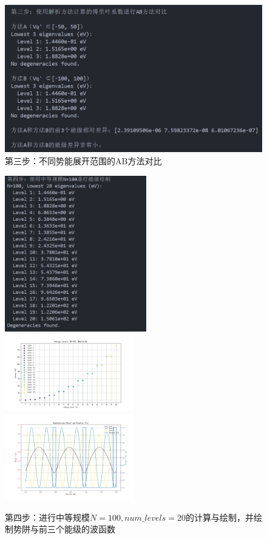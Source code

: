 \begin{figure}[H]
    \centering
    \includegraphics[width=1.0\textwidth]{Problem_1/figs/3_comparison.png}
    \caption{第三步：不同势能展开范围的AB方法对比}
\end{figure}

\begin{figure}[H]
    \centering
    \includegraphics[width=0.55\textwidth]{Problem_1/figs/4_medium.png}
    \includegraphics[width=0.5\textwidth]{Problem_1/figs/energy_levs_medium.png}
    \includegraphics[width=0.5\textwidth]{Problem_1/figs/wave_funcs.png}
    \caption{第四步：进行中等规模$N=100,num\_levels=20$的计算与绘制，并绘制势阱与前三个能级的波函数}
\end{figure}

